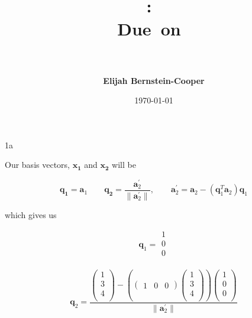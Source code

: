 \documentclass{article}
\title{\vspace{0in}
    \textmd{\textbf{\hmwkClass:\ \hmwkTitle}}\\
    \normalsize\vspace{0.1in}\small{Due\ on\ \hmwkDueDate}\\
    \vspace{0.1in}\large{\textit{\hmwkClassInstructor\ \hmwkClassTime}}
    \vspace{0.5in}}
\author{\textbf{Elijah Bernstein-Cooper}}
\date{\today} %
\begin{document}
\maketitle

\begin{homeworkProblem}

    \begin{homeworkSection}{1a}

        Our basis vectors, $\bm{x_1}$ and $\bm{x_2}$ will be

        \begin{equation*}
            \bm{q_1} = \bm{a}_1 \qquad \bm{q_2} =
            \frac{\bm{a}_2^\prime}{\|\bm{a}_2^\prime\|}, \qquad
            \bm{a}_2^\prime = \bm{a}_2 - (\bm{q}_1^T \bm{a}_2)\bm{q}_1
        \end{equation*}

        \noindent which gives us

        \begin{equation*}
            \bm{q}_1 = \begin{matrix} 1\\0\\0\\ \end{matrix}
        \end{equation*}

        \begin{equation*}
        \bm{q}_2 = \frac{ \left(\begin{matrix} 1\\3\\4\\ \end{matrix}\right) -
            \left(\left(\begin{matrix} 1&0&0 \end{matrix}\right)
                       \left(\begin{matrix} 1\\3\\4\\ \end{matrix}\right)\right)
               \left(\begin{matrix} 1\\0\\0\\\end{matrix}\right)}
                   {\|\bm{a}_2^\prime\|}
        \end{equation*}


\end{homeworkSection}
\end{homeworkProblem}
\end{document}
